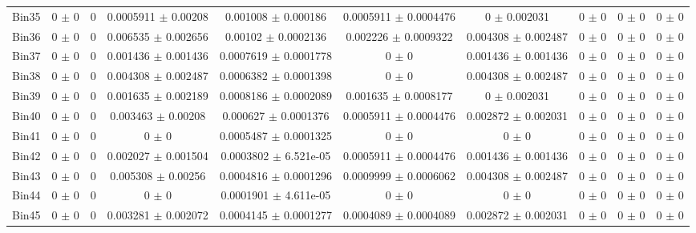 \begin{tabular}{@{\extracolsep{4pt}}lccccccccc@{}}
     Bin35 & 0 $\pm$ 0 & 0 & 0.0005911 $\pm$ 0.00208 & 0.001008 $\pm$ 0.000186 & 0.0005911 $\pm$ 0.0004476 & 0 $\pm$ 0.002031 & 0 $\pm$ 0 & 0 $\pm$ 0 & 0 $\pm$ 0 \\ 
     Bin36 & 0 $\pm$ 0 & 0 & 0.006535 $\pm$ 0.002656 & 0.00102 $\pm$ 0.0002136 & 0.002226 $\pm$ 0.0009322 & 0.004308 $\pm$ 0.002487 & 0 $\pm$ 0 & 0 $\pm$ 0 & 0 $\pm$ 0 \\ 
     Bin37 & 0 $\pm$ 0 & 0 & 0.001436 $\pm$ 0.001436 & 0.0007619 $\pm$ 0.0001778 & 0 $\pm$ 0 & 0.001436 $\pm$ 0.001436 & 0 $\pm$ 0 & 0 $\pm$ 0 & 0 $\pm$ 0 \\ 
     Bin38 & 0 $\pm$ 0 & 0 & 0.004308 $\pm$ 0.002487 & 0.0006382 $\pm$ 0.0001398 & 0 $\pm$ 0 & 0.004308 $\pm$ 0.002487 & 0 $\pm$ 0 & 0 $\pm$ 0 & 0 $\pm$ 0 \\ 
     Bin39 & 0 $\pm$ 0 & 0 & 0.001635 $\pm$ 0.002189 & 0.0008186 $\pm$ 0.0002089 & 0.001635 $\pm$ 0.0008177 & 0 $\pm$ 0.002031 & 0 $\pm$ 0 & 0 $\pm$ 0 & 0 $\pm$ 0 \\ 
     Bin40 & 0 $\pm$ 0 & 0 & 0.003463 $\pm$ 0.00208 & 0.000627 $\pm$ 0.0001376 & 0.0005911 $\pm$ 0.0004476 & 0.002872 $\pm$ 0.002031 & 0 $\pm$ 0 & 0 $\pm$ 0 & 0 $\pm$ 0 \\ 
     Bin41 & 0 $\pm$ 0 & 0 & 0 $\pm$ 0 & 0.0005487 $\pm$ 0.0001325 & 0 $\pm$ 0 & 0 $\pm$ 0 & 0 $\pm$ 0 & 0 $\pm$ 0 & 0 $\pm$ 0 \\ 
     Bin42 & 0 $\pm$ 0 & 0 & 0.002027 $\pm$ 0.001504 & 0.0003802 $\pm$ 6.521e-05 & 0.0005911 $\pm$ 0.0004476 & 0.001436 $\pm$ 0.001436 & 0 $\pm$ 0 & 0 $\pm$ 0 & 0 $\pm$ 0 \\ 
     Bin43 & 0 $\pm$ 0 & 0 & 0.005308 $\pm$ 0.00256 & 0.0004816 $\pm$ 0.0001296 & 0.0009999 $\pm$ 0.0006062 & 0.004308 $\pm$ 0.002487 & 0 $\pm$ 0 & 0 $\pm$ 0 & 0 $\pm$ 0 \\ 
     Bin44 & 0 $\pm$ 0 & 0 & 0 $\pm$ 0 & 0.0001901 $\pm$ 4.611e-05 & 0 $\pm$ 0 & 0 $\pm$ 0 & 0 $\pm$ 0 & 0 $\pm$ 0 & 0 $\pm$ 0 \\ 
     Bin45 & 0 $\pm$ 0 & 0 & 0.003281 $\pm$ 0.002072 & 0.0004145 $\pm$ 0.0001277 & 0.0004089 $\pm$ 0.0004089 & 0.002872 $\pm$ 0.002031 & 0 $\pm$ 0 & 0 $\pm$ 0 & 0 $\pm$ 0 \\ 
\hline\hline
  \end{tabular}
